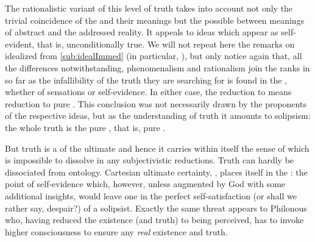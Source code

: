 The rationalistic variant of this level of truth takes into account not only the
trivial coincidence of the  and their meanings but the
possible  between meanings of abstract  and the addressed
reality. It appeals to  ideas which appear as self-evident, that
is, unconditionally true. We will not repeat here the
remarks on idealized  from \ref{sub:idealImmed} (in particular,
), but only notice again that, all the differences
notwithstanding, phenomenalism and rationalism join the ranks in so far as the
infallibility of the truth they are searching for is found in the
, whether of sensations or self-evidence.
In either case, the reduction
to  means reduction to pure . This conclusion was not
necessarily drawn by the proponents of the respective ideas, but as the
understanding of truth it amounts to solipsism:  the whole truth is the pure
, that is, pure .

\pa But truth is a  of the ultimate   and hence it carries within
itself the 
sense of  which is impossible to dissolve in any
subjectivistic reductions. Truth can hardly be dissociated from ontology.
Cartesian ultimate certainty, , places itself in the
: the point of self-evidence which, however, unless
augmented by God with some additional insights, would leave one in the perfect
self-satisfaction (or shall we rather say, despair?) of a solipsist. Exactly the
same threat appears to Philonous who, having reduced the existence (and truth)
to being  perceived, has to invoke higher consciousness to
ensure any {\em real} existence and truth.

